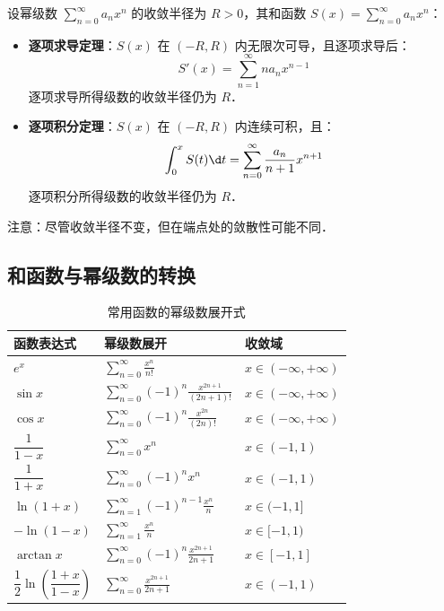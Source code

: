 \documentclass[12pt, a4paper, oneside, UTF8]{ctexbook}
\begin{document}
\begin{theorem}
    设幂级数 $\displaystyle\sum_{n=0}^\infty a_n x^n$ 的收敛半径为 $R > 0$，其和函数 $S(x) = \displaystyle\sum_{n=0}^\infty a_n x^n$：
    \begin{itemize}
        \item \textbf{逐项求导定理}：$S(x)$ 在 $(-R, R)$ 内无限次可导，且逐项求导后：
        \[ S'(x) = \sum_{n=1}^\infty n a_n x^{n-1} \]
        逐项求导所得级数的收敛半径仍为 $R$．
        \item \textbf{逐项积分定理}：$S(x)$ 在 $(-R, R)$ 内连续可积，且：
        \[ \int_0^x S(t) \d t = \sum_{n=0}^\infty \frac{a_n}{n+1} x^{n+1} \]
        逐项积分所得级数的收敛半径仍为 $R$．
    \end{itemize}
    注意：尽管收敛半径不变，但在端点处的敛散性可能不同．
\end{theorem}

\subsection{和函数与幂级数的转换}
\begin{table}[H]
    \centering
    \caption{常用函数的幂级数展开式}
    \renewcommand\arraystretch{1.5}
    \begin{tabular}{lll}
        \hline
        \textbf{函数表达式} & \textbf{幂级数展开} & \textbf{收敛域} \\
        \hline
        $e^x$ & $\displaystyle\sum_{n=0}^\infty \frac{x^n}{n!}$ & $ x \in (-\infty, +\infty)$ \\
        $\sin x$ & $\displaystyle\sum_{n=0}^\infty (-1)^n \frac{x^{2n+1}}{(2n+1)!}$ & $ x \in (-\infty, +\infty)$ \\
        $\cos x$ & $\displaystyle\sum_{n=0}^\infty (-1)^n \frac{x^{2n}}{(2n)!}$ & $ x \in (-\infty, +\infty)$ \\
        $\dfrac{1}{1-x}$ & $\displaystyle\sum_{n=0}^\infty x^n$ & $ x \in (-1, 1)$ \\
        $\dfrac{1}{1+x}$ & $\displaystyle\sum_{n=0}^\infty (-1)^n x^n$ & $ x \in (-1, 1)$ \\
        $\ln(1+x)$ & $\displaystyle\sum_{n=1}^\infty (-1)^{n-1} \frac{x^n}{n}$ & $x \in (-1, 1]$ \\
        $-\ln(1-x)$ & $\displaystyle\sum_{n=1}^\infty \frac{x^n}{n}$ & $x \in [-1, 1)$ \\
        $\arctan x$ & $\displaystyle\sum_{n=0}^\infty (-1)^n \frac{x^{2n+1}}{2n+1}$ & $ x \in [-1, 1]$ \\
        $\dfrac{1}{2}\ln\left(\dfrac{1+x}{1-x}\right)$ & $\displaystyle\sum_{n=0}^{\infty}\frac{x^{2n+1}}{2n+1}$ & $x\in (-1,1)$\\
        \hline
    \end{tabular}
\end{table}
\end{document}
